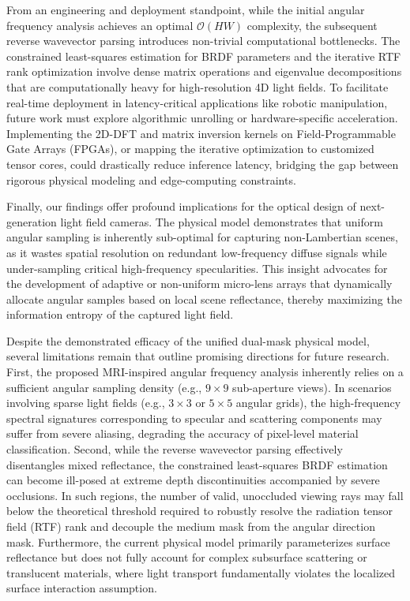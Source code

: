 \documentclass[journal]{IEEEtran}
\begin{document}
From an engineering and deployment standpoint, while the initial angular frequency analysis achieves an optimal \(\mathcal{O}(HW)\) complexity, the subsequent reverse wavevector parsing introduces non-trivial computational bottlenecks. The constrained least-squares estimation for BRDF parameters and the iterative RTF rank optimization involve dense matrix operations and eigenvalue decompositions that are computationally heavy for high-resolution 4D light fields. To facilitate real-time deployment in latency-critical applications like robotic manipulation, future work must explore algorithmic unrolling or hardware-specific acceleration. Implementing the 2D-DFT and matrix inversion kernels on Field-Programmable Gate Arrays (FPGAs), or mapping the iterative optimization to customized tensor cores, could drastically reduce inference latency, bridging the gap between rigorous physical modeling and edge-computing constraints.

Finally, our findings offer profound implications for the optical design of next-generation light field cameras. The physical model demonstrates that uniform angular sampling is inherently sub-optimal for capturing non-Lambertian scenes, as it wastes spatial resolution on redundant low-frequency diffuse signals while under-sampling critical high-frequency specularities. This insight advocates for the development of adaptive or non-uniform micro-lens arrays that dynamically allocate angular samples based on local scene reflectance, thereby maximizing the information entropy of the captured light field.

Despite the demonstrated efficacy of the unified dual-mask physical model, several limitations remain that outline promising directions for future research. First, the proposed MRI-inspired angular frequency analysis inherently relies on a sufficient angular sampling density (e.g., \(9 \times 9\) sub-aperture views). In scenarios involving sparse light fields (e.g., \(3 \times 3\) or \(5 \times 5\) angular grids), the high-frequency spectral signatures corresponding to specular and scattering components may suffer from severe aliasing, degrading the accuracy of pixel-level material classification. Second, while the reverse wavevector parsing effectively disentangles mixed reflectance, the constrained least-squares BRDF estimation can become ill-posed at extreme depth discontinuities accompanied by severe occlusions. In such regions, the number of valid, unoccluded viewing rays may fall below the theoretical threshold required to robustly resolve the radiation tensor field (RTF) rank and decouple the medium mask from the angular direction mask. Furthermore, the current physical model primarily parameterizes surface reflectance but does not fully account for complex subsurface scattering or translucent materials, where light transport fundamentally violates the localized surface interaction assumption.
\end{document}
